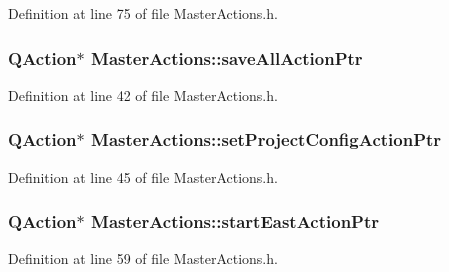 Definition at line 75 of file Master\-Actions.\-h.

\hypertarget{class_master_actions_a4e9bf6410023b508d56f235903a44b5f}{
\subsubsection[{save\-All\-Action\-Ptr}]{\setlength{\rightskip}{0pt plus 5cm}Q\-Action$\ast$ Master\-Actions\-::save\-All\-Action\-Ptr\hspace{0.3cm}{\ttfamily [private]}}}\label{class_master_actions_a4e9bf6410023b508d56f235903a44b5f}


Definition at line 42 of file Master\-Actions.\-h.

\hypertarget{class_master_actions_abe52f232f77f5a5bff35c8e3dadb3d80}{
\subsubsection[{set\-Project\-Config\-Action\-Ptr}]{\setlength{\rightskip}{0pt plus 5cm}Q\-Action$\ast$ Master\-Actions\-::set\-Project\-Config\-Action\-Ptr\hspace{0.3cm}{\ttfamily [private]}}}\label{class_master_actions_abe52f232f77f5a5bff35c8e3dadb3d80}


Definition at line 45 of file Master\-Actions.\-h.

\hypertarget{class_master_actions_a8ea0090704403ea15decad4e0104feb8}{
\subsubsection[{start\-East\-Action\-Ptr}]{\setlength{\rightskip}{0pt plus 5cm}Q\-Action$\ast$ Master\-Actions\-::start\-East\-Action\-Ptr\hspace{0.3cm}{\ttfamily [private]}}}\label{class_master_actions_a8ea0090704403ea15decad4e0104feb8}


Definition at line 59 of file Master\-Actions.\-h.

